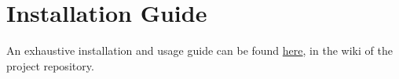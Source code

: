 \section{Installation Guide}
An exhaustive installation and usage guide can be found \href{https://github.com/gio-del/BattistonDeLuciaCurro-swe2/wiki/}{here}, in the wiki of the project repository.